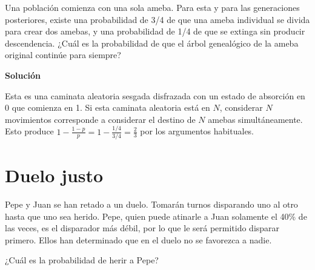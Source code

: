 \documentclass[12pt]{article}
\begin{document}
Una población comienza con una sola ameba. Para esta y para las generaciones
posteriores, existe una probabilidad de 3/4 de que una ameba individual se
divida para crear dos amebas, y una probabilidad de 1/4 de que se extinga sin
producir descendencia. ¿Cuál es la probabilidad de que el árbol genealógico de
la ameba original continúe para siempre?

\textbf{Solución}

Esta es una caminata aleatoria sesgada disfrazada con un estado de absorción en
0 que comienza en 1. Si esta caminata aleatoria está en $N$, considerar $N$
movimientos corresponde a considerar el destino de $N$ amebas simultáneamente.
Esto produce $1-\frac{1-p}{p}=1-\frac{1/4}{3/4}=\frac{2}{3}$ por los argumentos
habituales.

\section{Duelo justo}

Pepe y Juan se han retado a un duelo. Tomarán turnos disparando uno al otro
hasta que uno sea herido. Pepe, quien puede atinarle a Juan solamente el 40\% de
las veces, es el disparador más débil, por lo que le será permitido disparar
primero. Ellos han determinado que en el duelo no se favorezca a nadie.

¿Cuál es la probabilidad de herir a Pepe?
\end{document}
